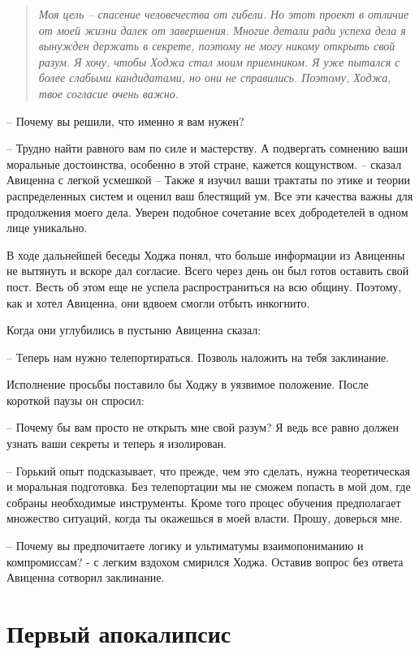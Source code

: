 \documentclass[12pt,a4paper]{article}
\begin{document}
\begin{quotation}
	\textit{Моя цель -- спасение человечества от гибели. Но этот проект в отличие от моей жизни далек от завершения. Многие детали ради успеха дела я вынужден держать в секрете, поэтому не могу никому открыть свой разум. Я хочу, чтобы Ходжа стал моим приемником. Я уже пытался с более слабыми кандидатами, но они не справились. Поэтому, Ходжа, твое согласие очень важно.}
\end{quotation}

-- Почему вы решили, что именно я вам нужен?

-- Трудно найти равного вам по силе и мастерству. А подвергать сомнению ваши моральные достоинства, особенно в этой стране, кажется кощунством. -- сказал Авиценна с легкой усмешкой -- Также я изучил ваши трактаты по этике и теории распределенных систем и оценил ваш блестящий ум. Все эти качества важны для продолжения моего дела. Уверен подобное сочетание всех добродетелей в одном лице уникально.

В ходе дальнейшей беседы Ходжа понял, что больше информации из Авиценны не вытянуть и вскоре дал согласие. Всего через день он был готов оставить свой пост. Весть об этом еще не успела распространиться на всю общину. Поэтому, как и хотел Авиценна, они вдвоем смогли отбыть инкогнито.

Когда они углубились в пустыню Авиценна сказал:

-- Теперь нам нужно телепортираться. Позволь наложить на тебя заклинание.

Исполнение просьбы поставило бы Ходжу в уязвимое положение. После короткой паузы он спросил:

-- Почему бы вам просто не открыть мне свой разум? Я ведь все равно должен узнать ваши секреты и теперь я изолирован.

-- Горький опыт подсказывает, что прежде, чем это сделать, нужна теоретическая и моральная подготовка. Без телепортации мы не сможем попасть в мой дом, где собраны необходимые инструменты. Кроме того процес обучения предполагает множество ситуаций, когда ты окажешься в моей власти. Прошу, доверься мне.

-- Почему вы предпочитаете логику и ультиматумы взаимопониманию и компромиссам? - с легким вздохом смирился Ходжа.
Оставив вопрос без ответа Авиценна сотворил заклинание.



\section*{Первый апокалипсис}
\end{document}

